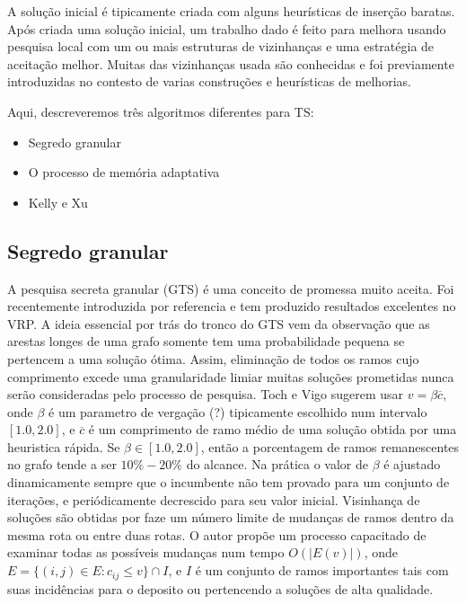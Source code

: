  A solução inicial é tipicamente criada com alguns heurísticas de inserção baratas. Após criada uma
solução inicial, um trabalho dado é feito para melhora usando pesquisa local com um ou mais
estruturas de vizinhanças e uma estratégia de aceitação melhor. Muitas das vizinhanças usada são
conhecidas e foi previamente introduzidas no contesto de varias construções e heurísticas de
melhorias.

 Aqui, descreveremos três algoritmos diferentes para TS:

\begin{itemize}
\item Segredo granular
\item O processo de memória adaptativa
\item Kelly e Xu
\end{itemize} 

\subsection{Segredo granular}

 A pesquisa secreta granular (GTS) é uma conceito de promessa muito aceita. Foi recentemente
introduzida por {\color{red} referencia} e tem produzido resultados excelentes no VRP. A ideia
essencial por trás do tronco do GTS vem da observação que as arestas longes de uma grafo somente tem
uma probabilidade pequena se pertencem a uma solução ótima. Assim, eliminação de todos os ramos cujo
comprimento excede uma granularidade limiar muitas soluções prometidas nunca serão consideradas pelo
processo de pesquisa. Toch e Vigo sugerem usar $v = \beta \overline{c}$, onde $\beta$ é um parametro
de vergação (?) tipicamente escolhido num intervalo $[1.0, 2.0]$, e $\overline{c}$ é um comprimento
de ramo médio de uma solução obtida por uma heuristica rápida. Se $\beta \in [1.0, 2.0]$, então a
porcentagem de ramos remanescentes no grafo tende a ser $10\%-20\%$ do alcance. Na prática o valor
de $\beta$ é ajustado dinamicamente sempre que o incumbente não tem provado para um conjunto de
iterações, e periódicamente decrescido para seu valor inicial. Visinhança de soluções são obtidas
por faze um número limite de mudanças de ramos dentro da mesma rota ou entre duas rotas. O autor
propõe um processo capacitado de examinar todas as possíveis mudanças num tempo $O(|E(v)|)$, onde
$E=\{(i,j) \in E: c_{ij} \leq v\} \cap I$, e $I$ é um conjunto de ramos importantes tais com suas
incidências para o deposito ou pertencendo a soluções de alta qualidade.


